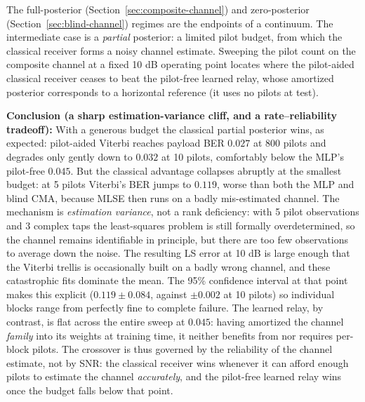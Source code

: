 The full-posterior (Section~\ref{sec:composite-channel}) and zero-posterior (Section~\ref{sec:blind-channel}) regimes are the endpoints of a continuum. The intermediate case is a \emph{partial} posterior: a limited pilot budget, from which the classical receiver forms a noisy channel estimate. Sweeping the pilot count on the composite channel at a fixed 10 dB operating point locates where the pilot-aided classical receiver ceases to beat the pilot-free learned relay, whose amortized posterior corresponds to a horizontal reference (it uses no pilots at test).

\textbf{Conclusion (a sharp estimation-variance cliff, and a rate--reliability tradeoff):} With a generous budget the classical partial posterior wins, as expected: pilot-aided Viterbi reaches payload BER $0.027$ at 800 pilots and degrades only gently down to $0.032$ at 10 pilots, comfortably below the MLP's pilot-free $0.045$. But the classical advantage collapses abruptly at the smallest budget: at 5 pilots Viterbi's BER jumps to $0.119$, worse than both the MLP and blind CMA, because MLSE then runs on a badly mis-estimated channel. The mechanism is \emph{estimation variance}, not a rank deficiency: with 5 pilot observations and 3 complex taps the least-squares problem is still formally overdetermined, so the channel remains identifiable in principle, but there are too few observations to average down the noise. The resulting LS error at 10 dB is large enough that the Viterbi trellis is occasionally built on a badly wrong channel, and these catastrophic fits dominate the mean. The 95\% confidence interval at that point makes this explicit ($0.119 \pm 0.084$, against $\pm 0.002$ at 10 pilots) so individual blocks range from perfectly fine to complete failure. The learned relay, by contrast, is flat across the entire sweep at $0.045$: having amortized the channel \emph{family} into its weights at training time, it neither benefits from nor requires per-block pilots. The crossover is thus governed by the reliability of the channel estimate, not by SNR: the classical receiver wins whenever it can afford enough pilots to estimate the channel \emph{accurately}, and the pilot-free learned relay wins once the budget falls below that point.


